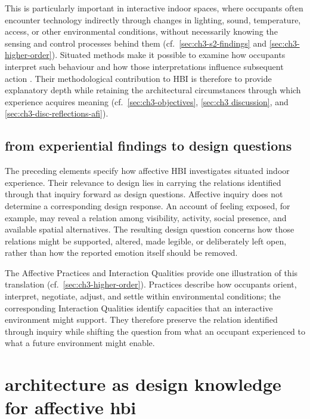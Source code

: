 This is particularly important in interactive indoor spaces, where
occupants often encounter technology indirectly through changes in
lighting, sound, temperature, access, or other environmental conditions,
without necessarily knowing the sensing and control processes behind
them \cite{saputra2023smart,daissaoui2020iot} (cf.~\autoref{sec:ch3-s2-findings} and \autoref{sec:ch3-higher-order}). Situated methods make it possible to examine how occupants interpret such behaviour and how those
interpretations influence subsequent action \cite{dourish2001action, bellotti2002making, hu2023scoping,lim2009and}. Their methodological contribution to HBI is therefore to provide explanatory depth while retaining the architectural circumstances through which experience acquires meaning (cf.~\autoref{sec:ch3-objectives}, \autoref{sec:ch3 discussion}, and \autoref{sec:ch3-disc-reflections-afi}).


\subsection{from experiential findings to design questions}
\label{subsec:experiential-design-knowledge}

The preceding elements specify how affective HBI investigates situated
indoor experience. Their relevance to design lies in carrying the
relations identified through that inquiry forward as design questions.
Affective inquiry does not determine a corresponding design response.
An account of feeling exposed, for example, may reveal a relation among
visibility, activity, social presence, and available spatial
alternatives. The resulting design question concerns how those
relations might be supported, altered, made legible, or deliberately
left open, rather than how the reported emotion itself should be
removed.

The Affective Practices and Interaction Qualities provide one
illustration of this translation
(cf.~\autoref{sec:ch3-higher-order}). Practices describe how occupants
orient, interpret, negotiate, adjust, and settle within environmental
conditions; the corresponding Interaction Qualities identify
capacities that an interactive environment might support. They
therefore preserve the relation identified through inquiry while
shifting the question from what an occupant experienced to what a
future environment might enable.

\clearpage
\section{architecture as design knowledge for affective hbi}
\label{sec:architecture-design-knowledge}


